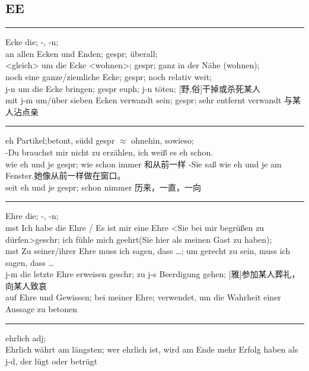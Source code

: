 \subsection{EE}
\label{app:dict:EE}
\noindent

\noindent\rule{\textwidth}{1pt}
Ecke die; -, -n;\\
an allen Ecken und Enden; gespr; \"uberall; \\
<gleich> um die Ecke <wohnen>; gespr; ganz in der N\"ahe (wohnen); \\
noch eine ganze/ziemliche Ecke; gespr; noch relativ weit; \\
j-n um die Ecke bringen; gespr euph; j-n t\"oten; [野,俗]干掉或杀死某人\\
mit j-m um/\"uber sieben Ecken verwandt sein; gespr; sehr entfernt verwandt 与某人沾点亲\\

\noindent\rule{\textwidth}{1pt}
eh Partikel;betont, s\"udd gespr $\approx$ ohnehin, sowieso;\\
-Du brauchst mir nicht zu erz\"ahlen, ich wei\ss{} es eh schon. \\
wie eh und je gespr; wie schon immer 和从前一样 -Sie sa\ss{} wie eh und je am Fenster.她像从前一样做在窗口。\\
seit eh und je gespr; schon nimmer 历来，一直，一向\\

\noindent\rule{\textwidth}{1pt}
Ehre die; -, -n; \\
mst Ich habe die Ehre / Es ist mir eine Ehre <Sie bei mir begr\"u\ss{}en zu d\"urfen>geschr; ich f\"uhle mich geehrt(Sie hier als meinen Gast zu haben); \\
mst Zu seiner/ihrer Ehre muss ich sagen, dass \dots ; um gerecht zu sein, muss ich sagen, dass \dots \\
j-m die letzte Ehre erweisen geschr; zu j-s Beerdigung gehen; [雅]参加某人葬礼，向某人致哀\\
auf Ehre und Gewissen; bei meiner Ehre; verwendet, um die Wahrheit einer Aussage zu betonen \\

\noindent\rule{\textwidth}{1pt}
ehrlich adj; \\
Ehrlich w\"ahrt am l\"angsten; wer ehrlich ist, wird am Ende mehr Erfolg haben als j-d, der l\"ugt oder betr\"ugt \\

